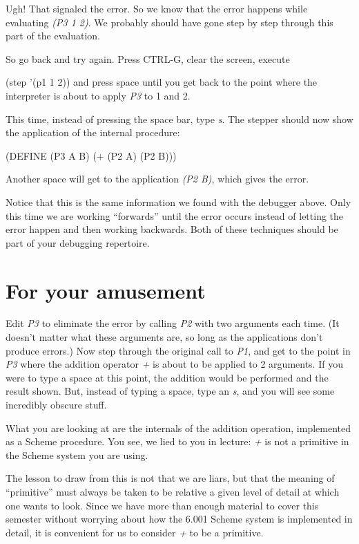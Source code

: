 Ugh!  That signaled the error.  So we know that the error happens
while evaluating {\it (P3 1 2)}.  We probably should have gone step
by step through this part of the evaluation.

So go back and try again.  Press CTRL-G, clear the screen,
execute
\beginlisp

(step '(p1 1 2))
\endlisp
and press space until you get back to the point where the
interpreter is about to apply {\it P3} to 1 and 2.

This time, instead of pressing the space bar, type {\it s}.
The stepper should now show the application of the internal procedure:
\beginlisp

(DEFINE (P3 A B) (+ (P2 A) (P2 B)))
\endlisp

Another space will get to the application {\it (P2 B)}, which gives
the error.

Notice that this is the same information we found with the
debugger above.  Only this time we are working ``forwards'' until
the error occurs instead of letting the error happen and then
working backwards.  Both of these techniques should be part of
your debugging repertoire.


\section{For your amusement}

Edit {\it P3} to eliminate the error by calling {\it P2} with two
arguments each time.  (It doesn't matter what these
arguments are, so long as the applications don't produce errors.) 
Now step through the original call to {\it P1}, and get to the point in
{\it P3} where the addition operator {\it +} is about to be applied
to 2 arguments.  If you were to type a space at this point, the
addition would be performed and the result shown.  But, instead
of typing a space, type an {\it s}, and you will see some incredibly
obscure stuff.

What you are looking at are the internals of the addition
operation, implemented as a Scheme procedure.  You see, we lied
to you in lecture: {\it +} is not a primitive in the Scheme system
you are using.

The lesson to draw from this is not that we are liars, but that
the meaning of ``primitive'' must always be taken to be relative
a given level of detail at which one wants to look.  Since we
have more than enough material to cover this semester without
worrying about how the 6.001 Scheme system is implemented in
detail, it is convenient for us to consider {\it +} to be a primitive.

